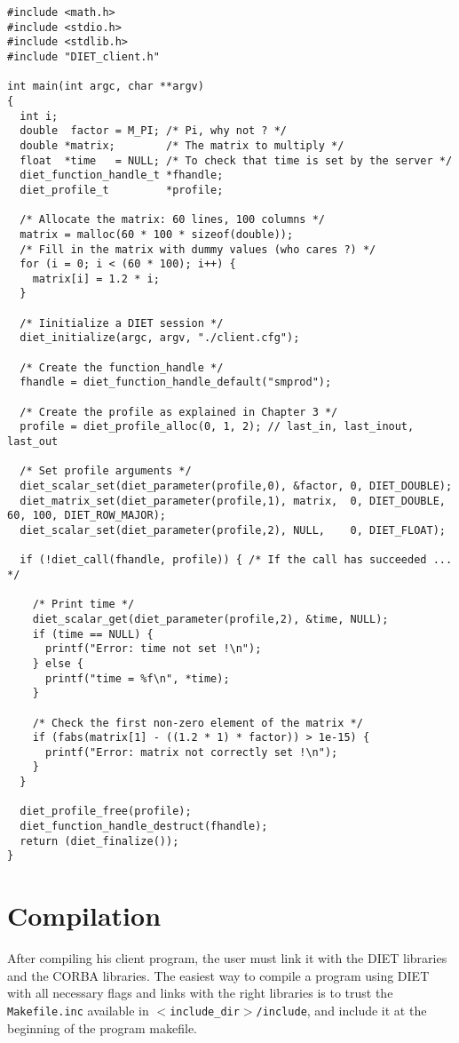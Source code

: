 {\footnotesize
\begin{verbatim}
#include <math.h>
#include <stdio.h>
#include <stdlib.h>
#include "DIET_client.h"

int main(int argc, char **argv)
{
  int i;
  double  factor = M_PI; /* Pi, why not ? */
  double *matrix;        /* The matrix to multiply */
  float  *time   = NULL; /* To check that time is set by the server */
  diet_function_handle_t *fhandle;
  diet_profile_t         *profile;

  /* Allocate the matrix: 60 lines, 100 columns */
  matrix = malloc(60 * 100 * sizeof(double));
  /* Fill in the matrix with dummy values (who cares ?) */
  for (i = 0; i < (60 * 100); i++) {
    matrix[i] = 1.2 * i;
  }
  
  /* Iinitialize a DIET session */
  diet_initialize(argc, argv, "./client.cfg");

  /* Create the function_handle */
  fhandle = diet_function_handle_default("smprod");

  /* Create the profile as explained in Chapter 3 */
  profile = diet_profile_alloc(0, 1, 2); // last_in, last_inout, last_out
  
  /* Set profile arguments */
  diet_scalar_set(diet_parameter(profile,0), &factor, 0, DIET_DOUBLE);
  diet_matrix_set(diet_parameter(profile,1), matrix,  0, DIET_DOUBLE, 60, 100, DIET_ROW_MAJOR);
  diet_scalar_set(diet_parameter(profile,2), NULL,    0, DIET_FLOAT);
  
  if (!diet_call(fhandle, profile)) { /* If the call has succeeded ... */
     
    /* Print time */
    diet_scalar_get(diet_parameter(profile,2), &time, NULL);
    if (time == NULL) {
      printf("Error: time not set !\n");
    } else {
      printf("time = %f\n", *time);
    }

    /* Check the first non-zero element of the matrix */
    if (fabs(matrix[1] - ((1.2 * 1) * factor)) > 1e-15) {
      printf("Error: matrix not correctly set !\n");
    }
  }

  diet_profile_free(profile);
  diet_function_handle_destruct(fhandle);
  return (diet_finalize());
}
\end{verbatim}
}


\section{Compilation}
\label{sec:cl_comp}

After compiling his client program, the user must link it with the DIET
libraries and the CORBA libraries. The easiest way to compile a program using
DIET with all necessary flags and links with the right libraries is to trust the
\texttt{Makefile.inc} available in \texttt{$<$include\_dir$>$/include}, and
include it at the beginning of the program makefile.

